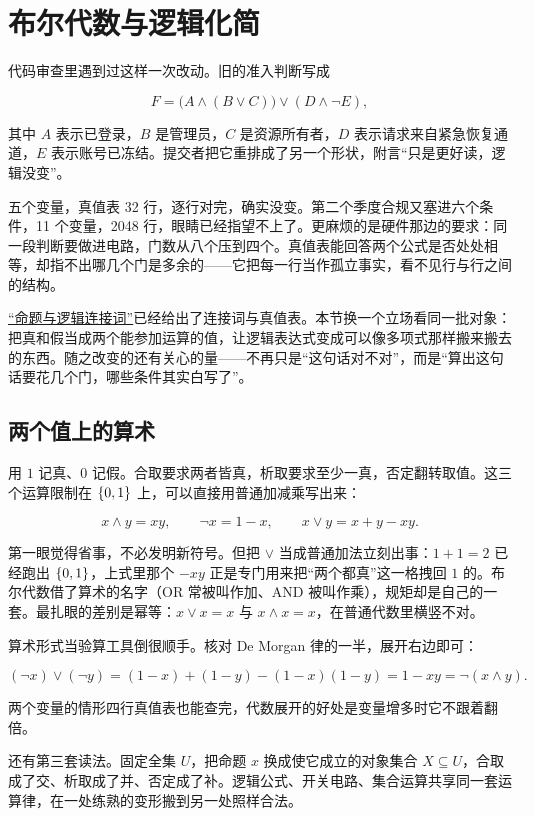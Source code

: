\section{布尔代数与逻辑化简}
\label{sec:04-Discrete-Mathematics/07-Boolean-Algebra-and-Automata/01}

代码审查里遇到过这样一次改动。旧的准入判断写成

\[
F=\bigl(A\land(B\lor C)\bigr)\lor(D\land\neg E),
\]

其中 \(A\) 表示已登录，\(B\) 是管理员，\(C\) 是资源所有者，\(D\) 表示请求来自紧急恢复通道，\(E\) 表示账号已冻结。提交者把它重排成了另一个形状，附言``只是更好读，逻辑没变''。

五个变量，真值表 32 行，逐行对完，确实没变。第二个季度合规又塞进六个条件，11 个变量，2048 行，眼睛已经指望不上了。更麻烦的是硬件那边的要求：同一段判断要做进电路，门数从八个压到四个。真值表能回答两个公式是否处处相等，却指不出哪几个门是多余的——它把每一行当作孤立事实，看不见行与行之间的结构。

\hyperref[sec:01-Mathematical-Language/01-Logic/01]{``命题与逻辑连接词''}已经给出了连接词与真值表。本节换一个立场看同一批对象：把真和假当成两个能参加运算的值，让逻辑表达式变成可以像多项式那样搬来搬去的东西。随之改变的还有关心的量——不再只是``这句话对不对''，而是``算出这句话要花几个门，哪些条件其实白写了''。

\subsection{两个值上的算术}

用 \(1\) 记真、\(0\) 记假。合取要求两者皆真，析取要求至少一真，否定翻转取值。这三个运算限制在 \(\left\{0,1\right\}\) 上，可以直接用普通加减乘写出来：

\[
x\land y=xy,\qquad \neg x=1-x,\qquad x\lor y=x+y-xy.
\]

第一眼觉得省事，不必发明新符号。但把 \(\lor\) 当成普通加法立刻出事：\(1+1=2\) 已经跑出 \(\left\{0,1\right\}\)，上式里那个 \(-xy\) 正是专门用来把``两个都真''这一格拽回 \(1\) 的。布尔代数借了算术的名字（OR 常被叫作加、AND 被叫作乘），规矩却是自己的一套。最扎眼的差别是幂等：\(x\lor x=x\) 与 \(x\land x=x\)，在普通代数里横竖不对。

算术形式当验算工具倒很顺手。核对 De Morgan 律的一半，展开右边即可：

\[
(\neg x)\lor(\neg y)=(1-x)+(1-y)-(1-x)(1-y)=1-xy=\neg(x\land y).
\]

两个变量的情形四行真值表也能查完，代数展开的好处是变量增多时它不跟着翻倍。

还有第三套读法。固定全集 \(U\)，把命题 \(x\) 换成使它成立的对象集合 \(X\subseteq U\)，合取成了交、析取成了并、否定成了补。逻辑公式、开关电路、集合运算共享同一套运算律，在一处练熟的变形搬到另一处照样合法。


